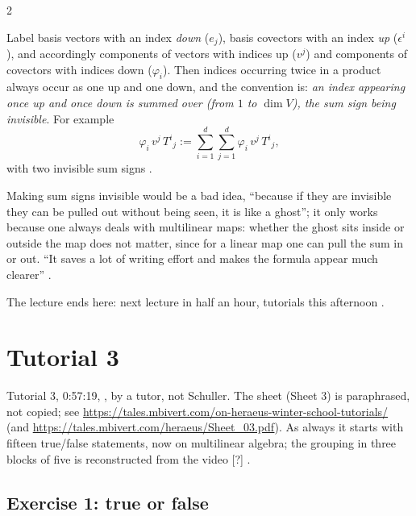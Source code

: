 \begin{paracol}{2}
\begin{definition}\label{def:c03-einstein}
Label basis vectors with an index \emph{down} ($e_j$), basis covectors with an index \emph{up} ($\epsilon^i$), and accordingly components of vectors with indices up ($v^j$) and components of covectors with indices down ($\varphi_i$). Then indices occurring twice in a product always occur as one up and one down, and the convention is:
\emph{an index appearing once up and once down is summed over (from $1$ to $\dim V$), the sum sign being invisible}. For example
\[
  \varphi_i\,v^j\,T^i{}_j:=\sum_{i=1}^d\sum_{j=1}^d\varphi_i\,v^j\,T^i{}_j,
\]
with two invisible sum signs .
\end{definition}
\begin{aside}
Making sum signs invisible would be a bad idea, ``because if they are invisible they can be pulled out without being seen, it is like a ghost''; it only works because one always deals with multilinear maps: whether the ghost sits inside or outside the map does not matter, since for a linear map
one can pull the sum in or out. ``It saves a lot of writing effort and makes the formula appear much clearer'' .
\end{aside}
The lecture ends here: next lecture in half an hour, tutorials this afternoon .

\section{Tutorial 3}\label{sec:t03-1}

Tutorial 3, 0:57:19, , by a tutor, not Schuller. The sheet (Sheet 3) is paraphrased, not copied; see \url{https://tales.mbivert.com/on-heraeus-winter-school-tutorials/} (and \url{https://tales.mbivert.com/heraeus/Sheet_03.pdf}).
As always it starts with fifteen true/false statements, now on multilinear algebra; the grouping in three blocks of five is reconstructed from the video [?] .

\subsection*{Exercise 1: true or false}


\end{paracol}
